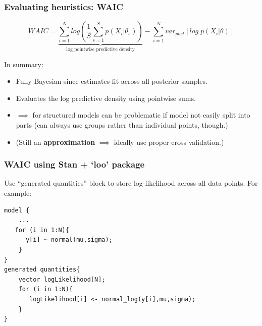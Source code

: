 \documentclass[handout]{beamer}
\begin{document}
\begin{frame}
	\frametitle{Evaluating heuristics: WAIC}
	\begin{equation}
	WAIC = \underbrace{\sum_{i=1}^{N} log\left(\frac{1}{S}\sum_{s=1}^{S} p(X_i|\theta_s)\right)}_{\text{log pointwise predictive density}} - \sum_{i=1}^{N} var_{post} \left[log\; p(X_i|\theta)\right]
	\end{equation}
	
	In summary:
	
	\begin{itemize}
		\item<3-> Fully Bayesian since estimates fit across all posterior samples.
		\item<4-> Evaluates the log predictive density using pointwise sums.
		\item<5-> $\implies$ for structured models can be problematic if model not easily split into parts (can always use groups rather than individual points, though.)
		\item<6-> (Still an \textbf{approximation} $\implies$ ideally use proper cross validation.)
	\end{itemize}
	
\end{frame}

\begin{frame}[fragile]
	\frametitle{WAIC using Stan + `loo' package}
	 Use ``generated quantities'' block to store log-likelihood across all data points. For example:
	
\begin{verbatim}
model {
    ...
   for (i in 1:N){
      y[i] ~ normal(mu,sigma);
    }
}
generated quantities{
    vector logLikelihood[N];
    for (i in 1:N){
       logLikelihood[i] <- normal_log(y[i],mu,sigma);
    }
}
\end{verbatim}
	
\end{frame}
\end{document}
